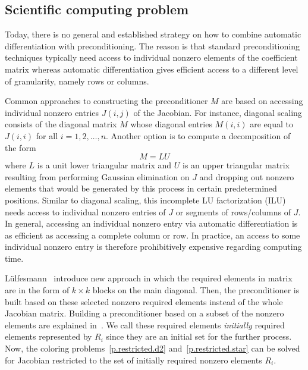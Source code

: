 \documentclass[12pt, twoside,a4paper,toc=bibliography]{scrbook}
\begin{document}
\subsection{Scientific computing problem}
\label{ss.problem.precond}
Today, there is no general and established
strategy on how to combine automatic differentiation with preconditioning. The reason is
that standard preconditioning techniques typically need access to individual nonzero
elements of the coefficient matrix whereas automatic differentiation gives efficient
access to a different level of granularity, namely rows or columns.

Common approaches to constructing the preconditioner $M$ are based on accessing individual
nonzero entries $J(i,j)$ of the Jacobian. For instance, diagonal scaling consists of the
diagonal matrix $M$ whose diagonal entries $M(i,i)$ are equal to $J(i,i)$ for all
$i=1,2,\dots, n$. Another option is to compute a decomposition of the form
$$M = LU$$
where $L$ is a unit lower triangular matrix and $U$ is an upper triangular matrix
resulting from performing Gaussian elimination on $J$ and dropping out nonzero elements
that would be generated by this process in certain predetermined positions. Similar to
diagonal scaling, this incomplete LU factorization (ILU) needs access to individual
nonzero entries of $J$ or segments of rows/columns of $J$. In general, accessing an
individual nonzero entry via automatic differentiation is as efficient as accessing a
complete column or row. In practice, an access to some individual nonzero entry is
therefore prohibitively expensive regarding computing time.

Lülfesmann~\cite{Lulfesmann2012Fap} introduce new approach in which the required elements in matrix
are in the form of $k\times k$ blocks on the main diagonal.
Then, the preconditioner is built based on these selected nonzero required elements instead of
the whole Jacobian matrix.
Building a preconditioner based on a subset of the nonzero elements are explained in~\cite{Cullum2006}.
We call these required elements \textit{initially} required elements 
represented by $R_i$
since they are an initial set for the further process.
Now, the coloring problems~\ref{p.restricted.d2} 
and~\ref{p.restricted.star} can be solved for Jacobian
restricted to the set of initially required nonzero elements $R_i$. 
\end{document}
